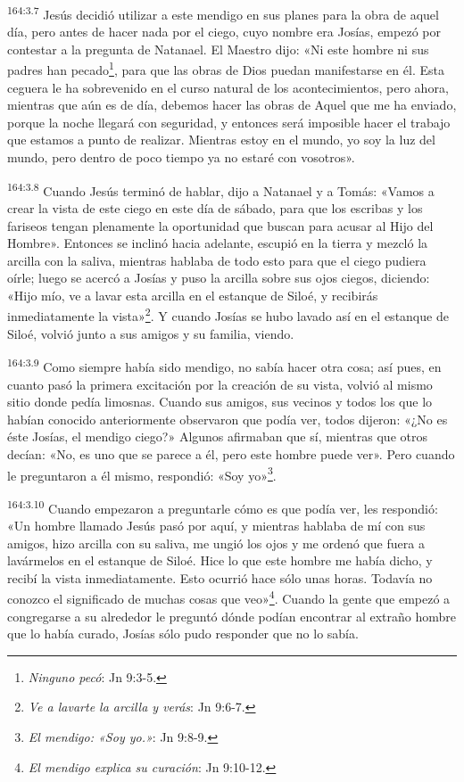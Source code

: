 \par
\textsuperscript{164:3.7} Jesús decidió utilizar a este mendigo en sus planes para la obra de aquel día, pero antes de hacer nada por el ciego, cuyo nombre era Josías, empezó por contestar a la pregunta de Natanael. El Maestro dijo: «Ni este hombre ni sus padres han pecado\footnote{\textit{Ninguno pecó}: Jn 9:3-5.}, para que las obras de Dios puedan manifestarse en él. Esta ceguera le ha sobrevenido en el curso natural de los acontecimientos, pero ahora, mientras que aún es de día, debemos hacer las obras de Aquel que me ha enviado, porque la noche llegará con seguridad, y entonces será imposible hacer el trabajo que estamos a punto de realizar. Mientras estoy en el mundo, yo soy la luz del mundo, pero dentro de poco tiempo ya no estaré con vosotros».

\par
\textsuperscript{164:3.8} Cuando Jesús terminó de hablar, dijo a Natanael y a Tomás: «Vamos a crear la vista de este ciego en este día de sábado, para que los escribas y los fariseos tengan plenamente la oportunidad que buscan para acusar al Hijo del Hombre». Entonces se inclinó hacia adelante, escupió en la tierra y mezcló la arcilla con la saliva, mientras hablaba de todo esto para que el ciego pudiera oírle; luego se acercó a Josías y puso la arcilla sobre sus ojos ciegos, diciendo: «Hijo mío, ve a lavar esta arcilla en el estanque de Siloé, y recibirás inmediatamente la vista»\footnote{\textit{Ve a lavarte la arcilla y verás}: Jn 9:6-7.}. Y cuando Josías se hubo lavado así en el estanque de Siloé, volvió junto a sus amigos y su familia, viendo.

\par
\textsuperscript{164:3.9} Como siempre había sido mendigo, no sabía hacer otra cosa; así pues, en cuanto pasó la primera excitación por la creación de su vista, volvió al mismo sitio donde pedía limosnas. Cuando sus amigos, sus vecinos y todos los que lo habían conocido anteriormente observaron que podía ver, todos dijeron: «¿No es éste Josías, el mendigo ciego?» Algunos afirmaban que sí, mientras que otros decían: «No, es uno que se parece a él, pero este hombre puede ver». Pero cuando le preguntaron a él mismo, respondió: «Soy yo»\footnote{\textit{El mendigo: «Soy yo.»}: Jn 9:8-9.}.

\par
\textsuperscript{164:3.10} Cuando empezaron a preguntarle cómo es que podía ver, les respondió: «Un hombre llamado Jesús pasó por aquí, y mientras hablaba de mí con sus amigos, hizo arcilla con su saliva, me ungió los ojos y me ordenó que fuera a lavármelos en el estanque de Siloé. Hice lo que este hombre me había dicho, y recibí la vista inmediatamente. Esto ocurrió hace sólo unas horas. Todavía no conozco el significado de muchas cosas que veo»\footnote{\textit{El mendigo explica su curación}: Jn 9:10-12.}. Cuando la gente que empezó a congregarse a su alrededor le preguntó dónde podían encontrar al extraño hombre que lo había curado, Josías sólo pudo responder que no lo sabía.


